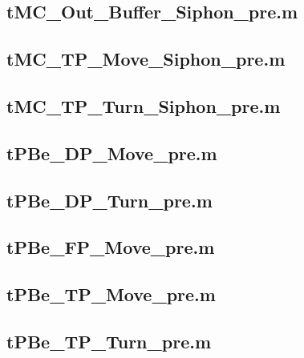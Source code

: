 \documentclass[runningheads,a4paper]{llncs}
\newcommand{\GPenSIM}{../GPenSIM}
\begin{document}
\subsection{tMC\_Out\_Buffer\_Siphon\_pre.m}
\label{app:tMC_Out_Buffer_Siphon_pre}


\subsection{tMC\_TP\_Move\_Siphon\_pre.m}
\label{app:tMC_TP_Move_Siphon_pre}


\subsection{tMC\_TP\_Turn\_Siphon\_pre.m}
\label{app:tMC_TP_Turn_Siphon_pre}


\subsection{tPBe\_DP\_Move\_pre.m}
\label{app:tPBe_DP_Move_pre}


\subsection{tPBe\_DP\_Turn\_pre.m}
\label{app:tPBe_DP_Turn_pre}


\subsection{tPBe\_FP\_Move\_pre.m}
\label{app:tPBe_FP_Move_pre}


\subsection{tPBe\_TP\_Move\_pre.m}
\label{app:tPBe_TP_Move_pre}


\subsection{tPBe\_TP\_Turn\_pre.m}
\label{app:tPBe_TP_Turn_pre}

\end{document}
